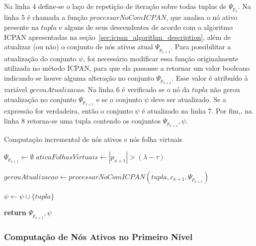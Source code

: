 Na linha 4 define-se o laço de repetição de iteração sobre todas tuplas de $\Psi_{p_x}$. Na linha 5 é chamada a função $processarNoComICPAN$, que analisa o nó ativo presente na $tupla$ e alguns de seus descendentes de acordo com o algoritmo ICPAN apresentadas na seção~\ref{sec:icpan_algorithm_description}, além de atualizar (ou não) o conjunto de nós ativos atual $\Psi_{p_{x+1}}$. Para possibilitar a atualização do conjunto $\psi$, foi necessário modificar essa função originalmente utilizada no método ICPAN, para que ela passasse a retornar um valor booleano indicando se houve alguma alteração no conjunto $\Psi_{p_{x+1}}$. Esse valor é atribuído à variável $gerouAtualizacao$. Na linha 6 é verificado se o nó da $tupla$ não gerou atualização no conjunto $\Psi_{p_{x+1}}$ e se o conjunto $\psi$ deve ser atualizado. Se a expressão for verdadeira, então o conjunto $\psi$ é atualizado na linha 7. Por fim,. na linha 8 retorna-se uma tupla contendo os conjuntos $\Psi_{p_{x+1}}, \psi$.

\begin{algorithm}[t]
\caption{Computação incremental de nós ativos e nós folha virtuais }\label{alg:compute_active_and_virtual_leaf_nodes}
\begin{algorithmic}[1]
    \State $\Psi_{p_{x+1}} \leftarrow \emptyset$
    \State $ativaFolhasVirtuais \leftarrow |p_{x+1}| > (\lambda - \tau)$
    
        \State $gerouAtualizacao \leftarrow processarNoComICPAN(tupla, c_{x+1}, \Psi_{p_{x+1}})$
        
            \State $\psi \leftarrow \psi \cup \{tupla\}$
        \EndIf
    \EndFor
    
    \State \textbf{return} $\Psi_{p_{x+1}}, \psi$
\EndFunction
\end{algorithmic}
\end{algorithm}

\subsubsection{Computação de Nós Ativos no Primeiro Nível}
\label{sec:first_level_active_node_set_computation}


